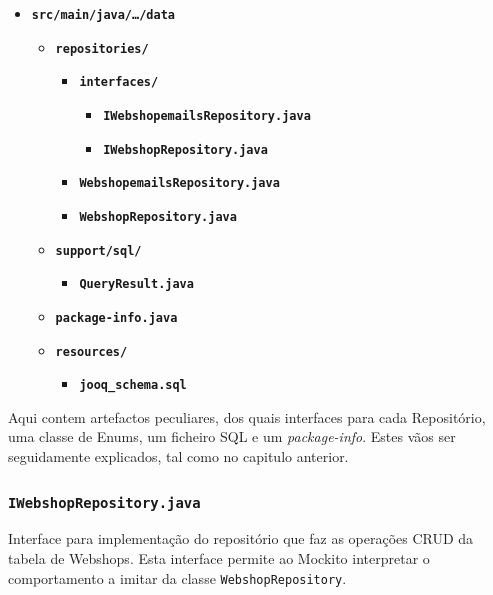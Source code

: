 \begin{itemize}
  \item \texttt{\textbf{src/main/java/\ldots/data}}\begin{itemize}
      \item \texttt{\textbf{repositories/}}\begin{itemize}
          \item \texttt{\textbf{interfaces/}}\begin{itemize}
              \item \texttt{\textbf{IWebshopemailsRepository.java}}
              \item \texttt{\textbf{IWebshopRepository.java}}
            \end{itemize}
          \item \texttt{\textbf{WebshopemailsRepository.java}}
          \item \texttt{\textbf{WebshopRepository.java}}
        \end{itemize}
      \item \texttt{\textbf{support/sql/}}\begin{itemize}
          \item \texttt{\textbf{QueryResult.java}}
        \end{itemize}
      \item \texttt{\textbf{package-info.java}}
      \item \texttt{\textbf{resources/}}\begin{itemize}
          \item \texttt{\textbf{jooq\_schema.sql}}
        \end{itemize}
    \end{itemize}
\end{itemize}

Aqui contem artefactos peculiares, dos quais interfaces para cada Repositório, uma classe de Enums, um ficheiro SQL e um \textit{package-info}. Estes vãos ser seguidamente explicados, tal como no capitulo anterior.

\newpage

\subsubsection*{\texttt{IWebshopRepository.java}}

Interface para implementação do repositório que faz as operações CRUD da tabela de Webshops. Esta interface permite ao Mockito interpretar o comportamento a imitar da classe \texttt{WebshopRepository}.

